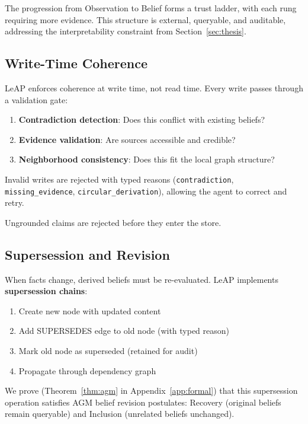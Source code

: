 \documentclass[11pt,letterpaper]{article}
\begin{document}
The progression from Observation to Belief forms a trust ladder, with each rung requiring more evidence. This structure is external, queryable, and auditable, addressing the interpretability constraint from Section~\ref{sec:thesis}.

\subsection{Write-Time Coherence}

LeAP enforces coherence at write time, not read time. Every write passes through a validation gate:

\begin{enumerate}[noitemsep]
    \item \textbf{Contradiction detection}: Does this conflict with existing beliefs?
    \item \textbf{Evidence validation}: Are sources accessible and credible?
    \item \textbf{Neighborhood consistency}: Does this fit the local graph structure?
\end{enumerate}

Invalid writes are rejected with typed reasons (\texttt{contradiction}, \texttt{missing\_evidence}, \texttt{circular\_derivation}), allowing the agent to correct and retry.

Ungrounded claims are rejected before they enter the store.

\subsection{Supersession and Revision}

When facts change, derived beliefs must be re-evaluated. LeAP implements \textbf{supersession chains}:

\begin{enumerate}[noitemsep]
    \item Create new node with updated content
    \item Add SUPERSEDES edge to old node (with typed reason)
    \item Mark old node as superseded (retained for audit)
    \item Propagate through dependency graph
\end{enumerate}

We prove (Theorem~\ref{thm:agm} in Appendix~\ref{app:formal}) that this supersession operation satisfies AGM belief revision postulates: Recovery (original beliefs remain queryable) and Inclusion (unrelated beliefs unchanged).
\end{document}
